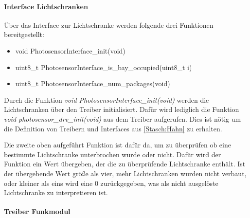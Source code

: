 \paragraph{Interface Lichtschranken}
Über das Interface zur Lichtschranke werden folgende drei Funktionen bereitgestellt:
\begin{itemize}
  \item void PhotosensorInterface\_init(void)
  \item uint8\_t PhotosensorInterface\_is\_bay\_occupied(uint8\_t i)
  \item uint8\_t PhotosensorInterface\_num\_packages(void)
\end{itemize}
Durch die Funktion \textit{void PhotosensorInterface\_init(void)} werden die Lichtschranken über den Treiber initialisiert. Dafür wird lediglich die Funktion \textit{void photosensor\_drv\_init(void)} aus dem Treiber aufgerufen. Dies ist nötig um die Definition von Treibern und Interfaces aus \autoref{Stasch:Hahn} zu erhalten.

Die zweite oben aufgeführt Funktion ist dafür da, um zu überprüfen ob eine bestimmte Lichtschranke unterbrochen wurde oder nicht. Dafür wird der Funktion ein Wert übergeben, der die zu überprüfende Lichtschranke enthält. Ist der übergebende Wert größe als vier, mehr Lichtschranken wurden nicht verbaut, oder kleiner als eins wird eine 0 zurückgegeben, was als nicht ausgelöste Lichtschranke zu interpretieren ist.

\paragraph{Treiber Funkmodul}


